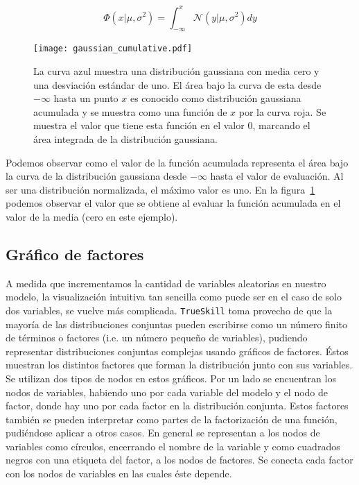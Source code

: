 \documentclass[11pt,twoside,spanish]{report} %
\begin{document}
\begin{equation}\label{eq:phi_norm}
 \Phi(x|\mu,\sigma^2) = \int_{-\infty}^{x}\mathcal{N}(y|\mu,\sigma^2)dy
\end{equation}


\begin{figure}[H]
	\centering
	\texttt{[image: gaussian\_cumulative.pdf]}
	\caption{La curva azul muestra una distribuci\'on gaussiana con media cero y una desviaci\'on est\'andar de uno. El \'area bajo la curva de esta desde $-\infty$ hasta un punto $x$ es conocido como distribuci\'on gaussiana acumulada y se muestra como una funci\'on de $x$ por la curva roja. Se muestra el valor que tiene esta funci\'on en el valor 0, marcando el \'area integrada de la distribuci\'on gaussiana.}
	\label{fig:acumulativa}
\end{figure}

Podemos observar como el valor de la funci\'on acumulada representa el \'area bajo la curva de la distribuci\'on gaussiana desde $-\infty$ hasta el valor de evaluaci\'on.
Al ser una distribuci\'on normalizada, el m\'aximo valor es uno.
En la figura~\ref{fig:acumulativa} podemos observar el valor que se obtiene al evaluar la funci\'on acumulada en el valor de la media (cero en este ejemplo).

\subsection{Gr\'afico de factores}

A medida que incrementamos la cantidad de variables aleatorias en nuestro modelo, la visualizaci\'on intuitiva tan sencilla como puede ser en el caso de solo dos variables, se vuelve m\'as complicada.
\texttt{TrueSkill} toma provecho de que la mayor\'ia de las distribuciones conjuntas  pueden escribirse como un n\'umero finito de t\'erminos o factores (i.e. un n\'umero peque\~no de variables),
pudiendo representar distribuciones conjuntas complejas usando gr\'aficos de factores.
\'Estos muestran los distintos factores que forman la distribuci\'on junto con sus variables.
Se utilizan dos tipos de nodos en estos gr\'aficos.
Por un lado se encuentran los nodos de variables, habiendo uno por cada variable del modelo y el nodo de factor, donde hay uno por cada factor en la distribuci\'on conjunta.
Estos factores tambi\'en se pueden interpretar como partes de la factorizaci\'on de una funci\'on, pudi\'endose aplicar a otros casos.
En general se representan a los nodos de variables como c\'irculos, encerrando el nombre de la variable y como cuadrados negros con una etiqueta del factor, a los nodos de factores.
Se conecta cada factor con los nodos de variables en las cuales \'este depende.
\end{document}
